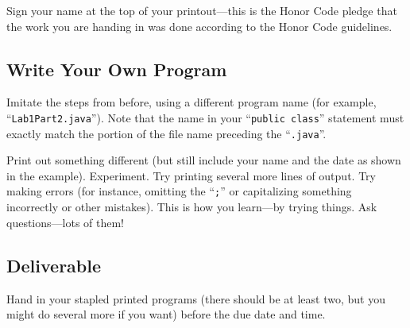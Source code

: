 

Sign your name at the top of your printout---this is the Honor Code pledge that the work you are handing in was done
according to the Honor Code guidelines.

\subsection*{Write Your Own Program}

Imitate the steps from before, using a different program name (for example, ``{\tt Lab1Part2.java}''). Note that the
name in your ``{\tt public class}'' statement must exactly match the portion of the file name preceding the ``{\tt .java}''.

Print out something different (but still include your name and the date as shown in the example). Experiment. Try
printing several more lines of output.  Try making errors (for instance, omitting the ``{\tt ;}'' or capitalizing
  something incorrectly or other mistakes). This is how you learn---by trying things. Ask questions---lots of them! 

\subsection*{Deliverable}

Hand in your stapled printed programs (there should be at least two, but you might do several more if you want) before
the due date and time. 

       
